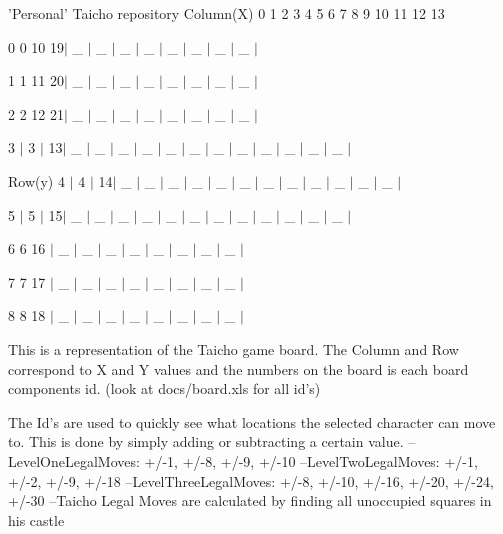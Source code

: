 'Personal' Taicho repository Column(\-X) 0 1 2 3 4 5 6 7 8 9 10 11 12 13 

 0 0 10 19$|$ \-\_\- $|$ \-\_\- $|$ \-\_\- $|$ \-\_\- $|$ \-\_\- $|$ \-\_\- $|$ \-\_\- $|$ \-\_\- $|$ 

 1 1 11 20$|$ \-\_\- $|$ \-\_\- $|$ \-\_\- $|$ \-\_\- $|$ \-\_\- $|$ \-\_\- $|$ \-\_\- $|$ \-\_\- $|$ 

 2 2 12 21$|$ \-\_\- $|$ \-\_\- $|$ \-\_\- $|$ \-\_\- $|$ \-\_\- $|$ \-\_\- $|$ \-\_\- $|$ \-\_\- $|$ 

 3 $|$ 3 $|$ 13$|$ \-\_\- $|$ \-\_\- $|$ \-\_\- $|$ \-\_\- $|$ \-\_\- $|$ \-\_\- $|$ \-\_\- $|$ \-\_\- $|$ \-\_\- $|$ \-\_\- $|$ \-\_\- $|$ \-\_\- $|$ 

 Row(y) 4 $|$ 4 $|$ 14$|$ \-\_\- $|$ \-\_\- $|$ \-\_\- $|$ \-\_\- $|$ \-\_\- $|$ \-\_\- $|$ \-\_\- $|$ \-\_\- $|$ \-\_\- $|$ \-\_\- $|$ \-\_\- $|$ \-\_\- $|$ 

 5 $|$ 5 $|$ 15$|$ \-\_\- $|$ \-\_\- $|$ \-\_\- $|$ \-\_\- $|$ \-\_\- $|$ \-\_\- $|$ \-\_\- $|$ \-\_\- $|$ \-\_\- $|$ \-\_\- $|$ \-\_\- $|$ \-\_\- $|$ 

 6 6 16 $|$ \-\_\- $|$ \-\_\- $|$ \-\_\- $|$ \-\_\- $|$ \-\_\- $|$ \-\_\- $|$ \-\_\- $|$ \-\_\- $|$ 

 7 7 17 $|$ \-\_\- $|$ \-\_\- $|$ \-\_\- $|$ \-\_\- $|$ \-\_\- $|$ \-\_\- $|$ \-\_\- $|$ \-\_\- $|$ 

 8 8 18 $|$ \-\_\- $|$ \-\_\- $|$ \-\_\- $|$ \-\_\- $|$ \-\_\- $|$ \-\_\- $|$ \-\_\- $|$ \-\_\- $|$

This is a representation of the Taicho game board. The Column and Row correspond to X and Y values and the numbers on the board is each board components id. (look at docs/board.\-xls for all id's)

The Id's are used to quickly see what locations the selected character can move to. This is done by simply adding or subtracting a certain value. --Level\-One\-Legal\-Moves\-: +/-\/1, +/-\/8, +/-\/9, +/-\/10 --Level\-Two\-Legal\-Moves\-: +/-\/1, +/-\/2, +/-\/9, +/-\/18 --Level\-Three\-Legal\-Moves\-: +/-\/8, +/-\/10, +/-\/16, +/-\/20, +/-\/24, +/-\/30 --Taicho Legal Moves are calculated by finding all unoccupied squares in his castle

